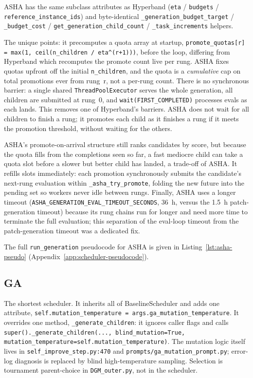 ASHA has the same subclass attributes as Hyperband (\texttt{eta} /
\texttt{budgets} / \texttt{reference\_instance\_ids}) and byte-identical
\texttt{\_generation\_budget\_target} / \texttt{\_budget\_cost} /
\texttt{get\_generation\_child\_count} / \texttt{\_task\_increments}
helpers.

The unique points: it precomputes a quota array at startup,
\texttt{promote\_quotas[r] = max(1, ceil(n\_children / eta\^{}(r+1)))},
before the loop, differing from Hyperband which recomputes the promote
count live per rung. ASHA fixes quotas upfront off the initial
\texttt{n\_children}, and the quota is a \emph{cumulative} cap on total
promotions ever from rung~r, not a per-rung count. There is no
synchronous barrier: a single shared \texttt{ThreadPoolExecutor} serves
the whole generation, all children are submitted at rung~0, and
\texttt{wait(FIRST\_COMPLETED)} processes evals as each lands. This
removes one of Hyperband's barriers. ASHA does not wait for all children
to finish a rung; it promotes each child as it finishes a rung if it
meets the promotion threshold, without waiting for the others.

ASHA's promote-on-arrival structure still ranks candidates by score, but
because the quota fills from the completions seen so far, a fast mediocre
child can take a quota slot before a slower but better child has landed, a
trade-off of ASHA. It refills slots immediately: each promotion
synchronously submits the candidate's next-rung evaluation within
\texttt{\_asha\_try\_promote}, folding the new future into the pending set
so workers never idle between rungs. Finally, ASHA uses a longer timeout
(\texttt{ASHA\_GENERATION\_EVAL\_TIMEOUT\_SECONDS}, 36~h, versus the
1.5~h patch-generation timeout) because its rung chains run for longer
and need more time to terminate the full evaluation; this separation of
the eval-loop timeout from the patch-generation timeout was a dedicated
fix.

The full \texttt{run\_generation} pseudocode for ASHA is given in
Listing~\ref{lst:asha-pseudo}
(Appendix~\ref{app:scheduler-pseudocode}).

\subsection{GA}

The shortest scheduler. It inherits all of BaselineScheduler and adds one
attribute, \texttt{self.mutation\_temperature =
args.ga\_mutation\_temperature}. It overrides one method,
\texttt{\_generate\_children}: it ignores caller flags and calls
\texttt{super().\_generate\_children(..., blind\_mutation=True,
mutation\_temperature=self.mutation\_temperature)}. The mutation logic
itself lives in \texttt{self\_improve\_step.py:470} and
\texttt{prompts/ga\_mutation\_prompt.py}; error-log diagnosis is replaced
by blind high-temperature sampling. Selection is tournament parent-choice
in \texttt{DGM\_outer.py}, not in the scheduler.

